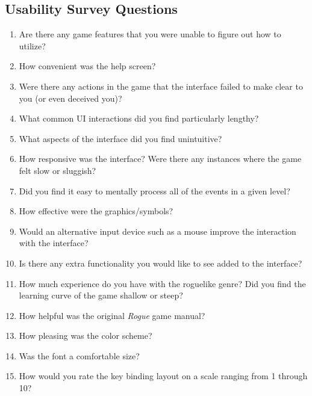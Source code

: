 \documentclass[12pt, titlepage]{article}
\begin{document}
\subsection{Usability Survey Questions}
	\begin{enumerate}
		\item Are there any game features that you were unable to figure out how to utilize?
		\item How convenient was the help screen?
		\item Were there any actions in the game that the interface failed to make clear to you (or even deceived you)?
		\item What common UI interactions did you find particularly lengthy?
		\item What aspects of the interface did you find unintuitive?
		\item How responsive was the interface?  Were there any instances where the game felt slow or sluggish?
		\item Did you find it easy to mentally process all of the events in a given level?
		\item How effective were the graphics/symbols?
		\item Would an alternative input device such as a mouse improve the interaction with the interface?
		\item Is there any extra functionality you would like to see added to the interface?
		\item How much experience do you have with the roguelike genre?  Did you find the learning curve of the game shallow or steep? 
		\item How helpful was the original \textit{Rogue} game manual?
		\item How pleasing was the color scheme?
		\item Was the font a comfortable size?
		\item How would you rate the key binding layout on a scale ranging from 1 through 10?
	\end{enumerate}
\end{document}
